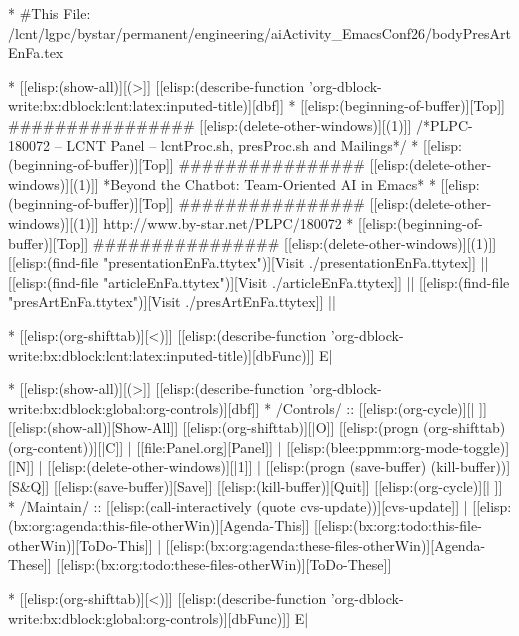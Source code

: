 
\begin{whenOrg}
*  #This File: /lcnt/lgpc/bystar/permanent/engineering/aiActivity_EmacsConf26/bodyPresArtEnFa.tex
\end{whenOrg}

\begin{whenOrg}
* [[elisp:(show-all)][(>]] [[elisp:(describe-function 'org-dblock-write:bx:dblock:lcnt:latex:inputed-title)][dbf]]
*  [[elisp:(beginning-of-buffer)][Top]] ################  [[elisp:(delete-other-windows)][(1)]]   /*PLPC-180072 -- LCNT Panel -- lcntProc.sh, presProc.sh and Mailings*/
*  [[elisp:(beginning-of-buffer)][Top]] ################  [[elisp:(delete-other-windows)][(1)]]   *Beyond the Chatbot: Team-Oriented AI in Emacs*
*  [[elisp:(beginning-of-buffer)][Top]] ################  [[elisp:(delete-other-windows)][(1)]]   http://www.by-star.net/PLPC/180072
*  [[elisp:(beginning-of-buffer)][Top]] ################  [[elisp:(delete-other-windows)][(1)]]   [[elisp:(find-file "presentationEnFa.ttytex")][Visit ./presentationEnFa.ttytex]] || [[elisp:(find-file "articleEnFa.ttytex")][Visit ./articleEnFa.ttytex]] || [[elisp:(find-file "presArtEnFa.ttytex")][Visit ./presArtEnFa.ttytex]] ||

* [[elisp:(org-shifttab)][<)]] [[elisp:(describe-function 'org-dblock-write:bx:dblock:lcnt:latex:inputed-title)][dbFunc)]]  E|
\end{whenOrg}

\begin{whenOrg}
* [[elisp:(show-all)][(>]] [[elisp:(describe-function 'org-dblock-write:bx:dblock:global:org-controls)][dbf]]
*  /Controls/ ::  [[elisp:(org-cycle)][| ]]  [[elisp:(show-all)][Show-All]]  [[elisp:(org-shifttab)][|O]]  [[elisp:(progn (org-shifttab) (org-content))][|C]] | [[file:Panel.org][Panel]] | [[elisp:(blee:ppmm:org-mode-toggle)][|N]] | [[elisp:(delete-other-windows)][|1]] | [[elisp:(progn (save-buffer) (kill-buffer))][S&Q]]  [[elisp:(save-buffer)][Save]]  [[elisp:(kill-buffer)][Quit]] [[elisp:(org-cycle)][| ]]
*  /Maintain/ ::  [[elisp:(call-interactively (quote cvs-update))][cvs-update]] | [[elisp:(bx:org:agenda:this-file-otherWin)][Agenda-This]] [[elisp:(bx:org:todo:this-file-otherWin)][ToDo-This]] | [[elisp:(bx:org:agenda:these-files-otherWin)][Agenda-These]] [[elisp:(bx:org:todo:these-files-otherWin)][ToDo-These]]

* [[elisp:(org-shifttab)][<)]] [[elisp:(describe-function 'org-dblock-write:bx:dblock:global:org-controls)][dbFunc)]]  E|
\end{whenOrg}

